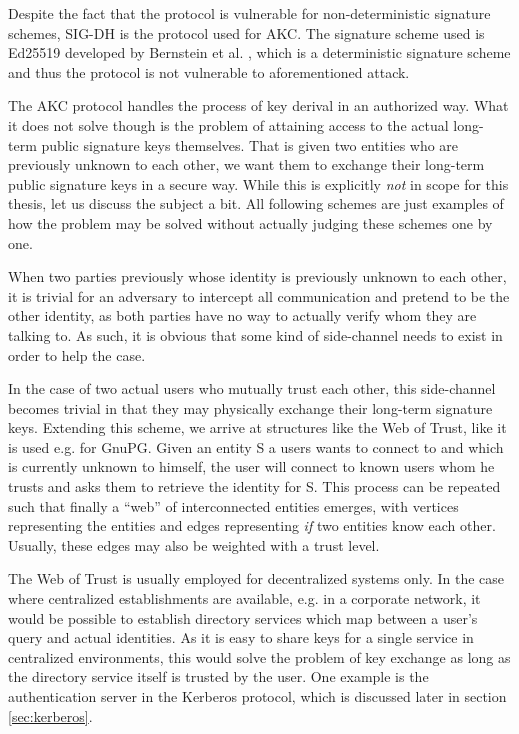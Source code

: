 Despite the fact that the protocol is vulnerable for non-deterministic signature schemes, SIG-DH is the protocol used for AKC.
The signature scheme used is Ed25519 developed by Bernstein et al. \cite{bernstein2012high}, which is a deterministic signature scheme and thus the protocol is not vulnerable to aforementioned attack.

\bigskip

The AKC protocol handles the process of key derival in an authorized way.
What it does not solve though is the problem of attaining access to the actual long-term public signature keys themselves.
That is given two entities who are previously unknown to each other, we want them to exchange their long-term public signature keys in a secure way.
While this is explicitly \emph{not} in scope for this thesis, let us discuss the subject a bit.
All following schemes are just examples of how the problem may be solved without actually judging these schemes one by one.

When two parties previously whose identity is previously unknown to each other, it is trivial for an adversary to intercept all communication and pretend to be the other identity, as both parties have no way to actually verify whom they are talking to.
As such, it is obvious that some kind of side-channel needs to exist in order to help the case.

In the case of two actual users who mutually trust each other, this side-channel becomes trivial in that they may physically exchange their long-term signature keys.
Extending this scheme, we arrive at structures like the Web of Trust, like it is used e.g. for GnuPG.
Given an entity S a users wants to connect to and which is currently unknown to himself, the user will connect to known users whom he trusts and asks them to retrieve the identity for S.
This process can be repeated such that finally a ``web'' of interconnected entities emerges, with vertices representing the entities and edges representing \emph{if} two entities know each other.
Usually, these edges may also be weighted with a trust level.

The Web of Trust is usually employed for decentralized systems only.
In the case where centralized establishments are available, e.g. in a corporate network, it would be possible to establish directory services which map between a user's query and actual identities.
As it is easy to share keys for a single service in centralized environments, this would solve the problem of key exchange as long as the directory service itself is trusted by the user.
One example is the authentication server in the Kerberos protocol, which is discussed later in section \ref{sec:kerberos}.

